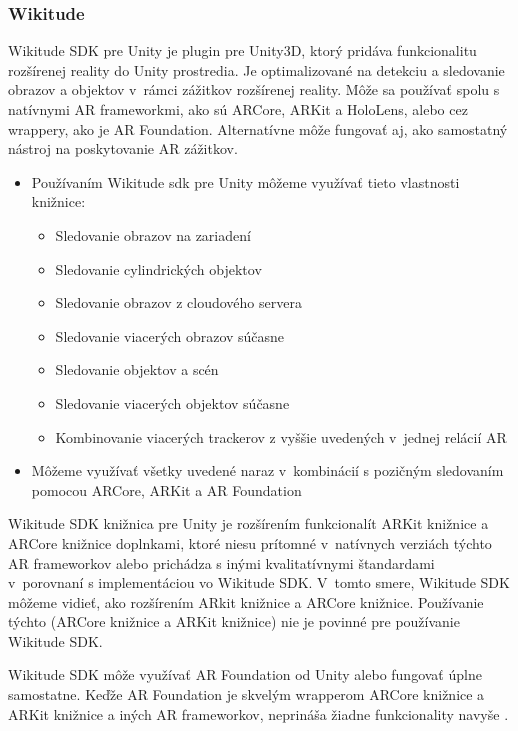 \cite{anand2024vuforia}

\subsubsection{Wikitude}

Wikitude SDK pre Unity je plugin pre Unity3D, ktorý pridáva funkcionalitu rozšírenej reality do Unity prostredia. Je optimalizované na detekciu a sledovanie obrazov a objektov v~rámci zážitkov rozšírenej reality. Môže sa používať spolu s natívnymi AR frameworkmi, ako sú ARCore, ARKit a HoloLens, alebo cez wrappery, ako je AR Foundation. Alternatívne môže fungovať aj, ako samostatný nástroj na poskytovanie AR zážitkov.

\begin{itemize}
    \item Používaním Wikitude \gls{sdk} pre Unity môžeme využívať tieto vlastnosti knižnice:
    \begin{itemize}
        \item Sledovanie obrazov na zariadení
        \item Sledovanie cylindrických objektov
        \item Sledovanie obrazov z cloudového servera
        \item Sledovanie viacerých obrazov súčasne
        \item Sledovanie objektov a scén
        \item Sledovanie viacerých objektov súčasne
        \item Kombinovanie viacerých trackerov z vyššie uvedených v~jednej relácií AR
    \end{itemize}
    \item Môžeme využívať všetky uvedené naraz v~kombinácií s pozičným sledovaním pomocou ARCore, ARKit a AR Foundation
\end{itemize}

Wikitude SDK knižnica pre Unity je rozšírením funkcionalít ARKit knižnice a ARCore knižnice doplnkami, ktoré niesu prítomné v~natívnych verziách týchto AR frameworkov alebo prichádza s inými kvalitatívnymi štandardami v~porovnaní s implementáciou vo Wikitude SDK. V~tomto smere, Wikitude SDK môžeme vidieť, ako rozšírením ARkit knižnice a ARCore knižnice. Používanie týchto (ARCore knižnice a ARKit knižnice) nie je povinné pre používanie Wikitude SDK.

Wikitude SDK môže využívať AR Foundation od Unity alebo fungovať úplne samostatne. Keďže AR Foundation je skvelým wrapperom ARCore knižnice a ARKit knižnice a iných AR frameworkov, neprináša žiadne funkcionality navyše \cite{wikitude2023sdk}. 

